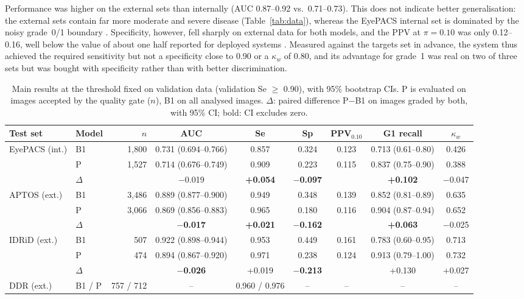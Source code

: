 \documentclass[11pt,a4paper]{article}
\begin{document}
Performance was higher on the external sets than internally (AUC 0.87--0.92 vs.\ 0.71--0.73). This does not indicate better generalisation: the external sets contain far more moderate and severe disease (Table~\ref{tab:data}), whereas the EyePACS internal set is dominated by the noisy grade~0/1 boundary \cite{krause2018}. Specificity, however, fell sharply on external data for both models, and the PPV at $\pi=0.10$ was only 0.12--0.16, well below the value of about one half reported for deployed systems \cite{wewetzer2021}. Measured against the targets set in advance, the system thus achieved the required sensitivity but not a specificity close to 0.90 or a $\kappa_w$ of 0.80, and its advantage for grade~1 was real on two of three sets but was bought with specificity rather than with better discrimination.

\begin{table}[t]
\centering\scriptsize
\caption{Main results at the threshold fixed on validation data (validation Se $\geq$ 0.90), with 95\% bootstrap CIs. P is evaluated on images accepted by the quality gate ($n$), B1 on all analysed images. $\Delta$: paired difference P$-$B1 on images graded by both, with 95\% CI; bold: CI excludes zero.}\label{tab:main}
\setlength{\tabcolsep}{2.5pt}
\begin{tabular}{@{}llrcccccc@{}}
\toprule
Test set & Model & $n$ & AUC & Se & Sp & PPV$_{0.10}$ & G1 recall & $\kappa_w$\\\midrule
\multirow{3}{*}{EyePACS (int.)} & B1 & 1{,}800 & 0.731 (0.694--0.766) & 0.857 & 0.324 & 0.123 & 0.713 (0.61--0.80) & 0.426\\
 & P & 1{,}527 & 0.714 (0.676--0.749) & 0.909 & 0.223 & 0.115 & 0.837 (0.75--0.90) & 0.388\\
 & $\Delta$ & & $-$0.019 & \textbf{+0.054} & \textbf{$-$0.097} & & \textbf{+0.102} & $-$0.047\\\midrule
\multirow{3}{*}{APTOS (ext.)} & B1 & 3{,}486 & 0.889 (0.877--0.900) & 0.949 & 0.348 & 0.139 & 0.852 (0.81--0.89) & 0.635\\
 & P & 3{,}066 & 0.869 (0.856--0.883) & 0.965 & 0.180 & 0.116 & 0.904 (0.87--0.94) & 0.652\\
 & $\Delta$ & & \textbf{$-$0.017} & \textbf{+0.021} & \textbf{$-$0.162} & & \textbf{+0.063} & $-$0.025\\\midrule
\multirow{3}{*}{IDRiD (ext.)} & B1 & 507 & 0.922 (0.898--0.944) & 0.953 & 0.449 & 0.161 & 0.783 (0.60--0.95) & 0.713\\
 & P & 474 & 0.894 (0.867--0.920) & 0.971 & 0.238 & 0.124 & 0.913 (0.79--1.00) & 0.732\\
 & $\Delta$ & & \textbf{$-$0.026} & +0.019 & \textbf{$-$0.213} & & +0.130 & +0.027\\\midrule
DDR (ext.) & B1 / P & 757 / 712 & -- & 0.960 / 0.976 & -- & -- & -- & --\\
\bottomrule
\end{tabular}
\end{table}
\end{document}
